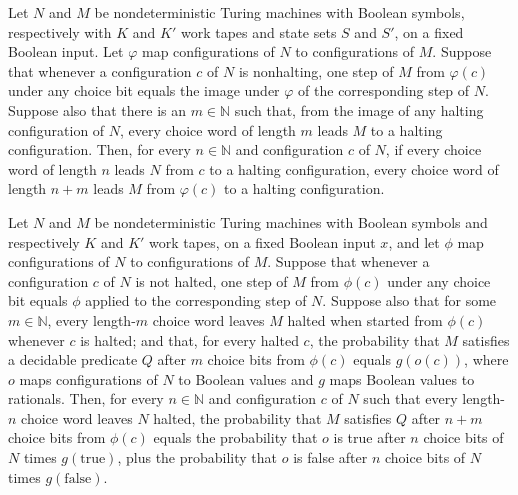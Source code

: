 \begin{theorem}
\label{Randomized.Amplify.halts_comp}
\leanok
{}
Let $N$ and $M$ be nondeterministic Turing machines with Boolean symbols, respectively
with $K$ and $K'$ work tapes and state sets $S$ and $S'$, on a fixed Boolean input. Let
$\varphi$ map configurations of $N$ to configurations of $M$. Suppose that whenever a
configuration $c$ of $N$ is nonhalting, one step of $M$ from $\varphi(c)$ under any
choice bit equals the image under $\varphi$ of the corresponding step of $N$. Suppose
also that there is an $m\in\mathbb{N}$ such that, from the image of any halting
configuration of $N$, every choice word of length $m$ leads $M$ to a halting
configuration. Then, for every $n\in\mathbb{N}$ and configuration $c$ of $N$, if every
choice word of length $n$ leads $N$ from $c$ to a halting configuration, every choice
word of length $n+m$ leads $M$ from $\varphi(c)$ to a halting configuration.
\end{theorem}

\begin{theorem}
\label{Randomized.Amplify.randProb_comp}
\leanok
{}
Let $N$ and $M$ be nondeterministic Turing machines with Boolean symbols and
respectively $K$ and $K'$ work tapes, on a fixed Boolean input $x$, and let $\phi$ map
configurations of $N$ to configurations of $M$. Suppose that whenever a configuration
$c$ of $N$ is not halted, one step of $M$ from $\phi(c)$ under any choice bit equals
$\phi$ applied to the corresponding step of $N$. Suppose also that for some
$m\in\mathbb{N}$, every length-$m$ choice word leaves $M$ halted when started from
$\phi(c)$ whenever $c$ is halted; and that, for every halted $c$, the probability that
$M$ satisfies a decidable predicate $Q$ after $m$ choice bits from $\phi(c)$ equals
$g(o(c))$, where $o$ maps configurations of $N$ to Boolean values and $g$ maps Boolean
values to rationals. Then, for every $n\in\mathbb{N}$ and configuration $c$ of $N$ such
that every length-$n$ choice word leaves $N$ halted, the probability that $M$ satisfies
$Q$ after $n+m$ choice bits from $\phi(c)$ equals the probability that $o$ is true after
$n$ choice bits of $N$ times $g(\mathrm{true})$, plus the probability that $o$ is false
after $n$ choice bits of $N$ times $g(\mathrm{false})$.
\end{theorem}

